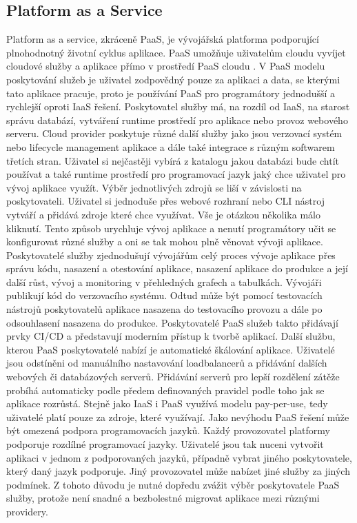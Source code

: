 \subsection{Platform as a Service}
    Platform as a service, zkráceně PaaS, je vývojářská platforma podporující plnohodnotný životní cyklus aplikace. PaaS umožňuje uživatelům cloudu vyvíjet cloudové služby a aplikace přímo v prostředí PaaS cloudu \cite{dilon2010cloud}.\newline
         V PaaS modelu poskytování služeb je uživatel zodpovědný pouze za aplikaci a data, se kterými tato aplikace pracuje, proto je používání PaaS pro programátory jednodušší a rychlejší oproti IaaS řešení. Poskytovatel služby má, na rozdíl od IaaS, na starost správu databází, vytváření runtime prostředí pro aplikace nebo provoz webového serveru. Cloud provider poskytuje různé další služby jako jsou verzovací systém nebo lifecycle management aplikace a dále také integrace s různým softwarem třetích stran. Uživatel si nejčastěji vybírá z katalogu jakou databázi bude chtít používat a také runtime prostředí pro programovací jazyk jaký chce uživatel pro vývoj aplikace využít. Výběr jednotlivých zdrojů se liší v závislosti na poskytovateli. Uživatel si jednoduše přes webové rozhraní nebo CLI nástroj vytváří a přidává zdroje které chce využívat. Vše je otázkou několika málo kliknutí. Tento způsob urychluje vývoj aplikace a nenutí programátory učit se konfigurovat různé služby a oni se tak mohou plně věnovat vývoji aplikace.\newline
	      Poskytovatelé služby zjednodušují vývojářům celý proces vývoje aplikace přes správu kódu, nasazení a otestování aplikace, nasazení aplikace do produkce a její další růst, vývoj a monitoring v přehledných grafech a tabulkách. Vývojáři publikují kód do verzovacího systému. Odtud může být pomocí testovacích nástrojů poskytovatelů aplikace nasazena do testovacího provozu a dále po odsouhlasení nasazena do produkce. Poskytovatelé PaaS služeb takto přidávají prvky CI/CD a představují  moderním přístup k tvorbě aplikací.\newline 
	      Další službu, kterou PaaS poskytovatelé nabízí je automatické škálování aplikace. Uživatelé jsou odstíněni od manuálního nastavování loadbalancerů a přidávání dalších webových či databázových serverů. Přidávání serverů pro lepší rozdělení zátěže probíhá automaticky podle předem definovaných pravidel podle toho jak se aplikace rozrůstá. Stejně jako IaaS i PaaS využívá modelu pay-per-use, tedy uživatelé platí pouze za zdroje, které využívají. Jako nevýhodu PaaS řešení může být omezená podpora programovacích jazyků. Každý provozovatel platformy podporuje rozdílné programovací jazyky. Uživatelé jsou tak nuceni vytvořit aplikaci  v jednom z podporovaných jazyků, případně vybrat jiného poskytovatele, který daný jazyk podporuje. Jiný provozovatel může nabízet jiné služby za jiných podmínek. Z tohoto důvodu je nutné dopředu zvážit výběr poskytovatele PaaS služby, protože není snadné a bezbolestné migrovat aplikace mezi různými providery.\newline 

